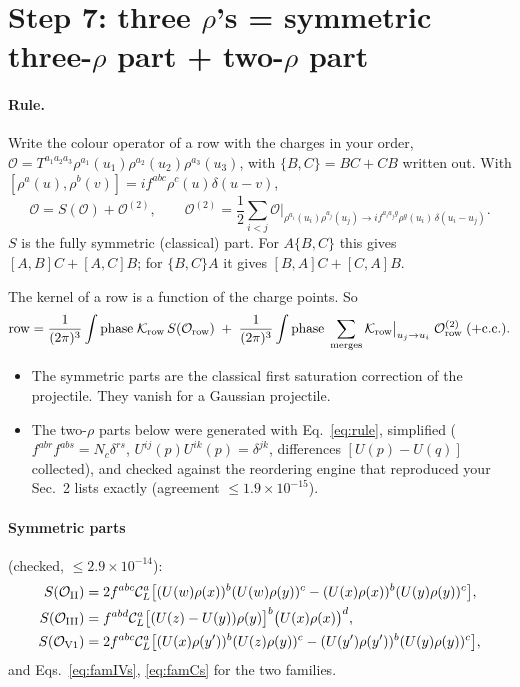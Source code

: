 \documentclass[10pt]{article}
\numberwithin{equation}{section}
\newcommand{\CL}{\mathcal C_L}
\newcommand{\OO}{\mathcal O}
\newcommand{\KK}{\mathcal K}
\newcommand{\pre}{\frac{1}{(2\pi)^3}}
\begin{document}
\section{Step 7: three \texorpdfstring{$\rho$}{rho}'s = symmetric three-\texorpdfstring{$\rho$}{rho} part + two-\texorpdfstring{$\rho$}{rho} part}\label{sec:three}
\paragraph{Rule.} Write the colour operator of a row with the charges in your order, $\OO=T^{a_1a_2a_3}\rho^{a_1}(u_1)\rho^{a_2}(u_2)\rho^{a_3}(u_3)$, with $\{B,C\}=BC+CB$ written out. With $[\rho^a(u),\rho^b(v)]=if^{abc}\rho^c(u)\delta(u-v)$,
\begin{equation}
\OO=S(\OO)+\OO^{(2)},\qquad\OO^{(2)}=\frac12\sum_{i<j}\OO\Big|_{\rho^{a_i}(u_i)\rho^{a_j}(u_j)\to if^{a_ia_jg}\rho^g(u_i)\,\delta(u_i-u_j)}.
\label{eq:rule}
\end{equation}
$S$ is the fully symmetric (classical) part. For $A\{B,C\}$ this gives $[A,B]C+[A,C]B$; for $\{B,C\}A$ it gives $[B,A]C+[C,A]B$.

The kernel of a row is a function of the charge points. So
\begin{equation*}
\text{row}=\pre\int\text{phase}\;\KK_{\rm row}\,S(\OO_{\rm row})\;+\;\pre\int\text{phase}\;\sum_{\rm merges}\KK_{\rm row}\big|_{u_j\to u_i}\;\OO^{(2)}_{\rm row}\;(+{\rm c.c.}).
\end{equation*}
\begin{itemize}
\item The symmetric parts are the classical first saturation correction of the projectile. They vanish for a Gaussian projectile.
\item The two-$\rho$ parts below were generated with Eq.~\eqref{eq:rule}, simplified ($f^{abr}f^{abs}=N_c\delta^{rs}$, $U^{ij}(p)U^{ik}(p)=\delta^{jk}$, differences $[U(p)-U(q)]$ collected), and checked against the reordering engine that reproduced your Sec.~2 lists exactly (agreement $\le$$1.9\times10^{-15}$).
\end{itemize}
\paragraph{Symmetric parts} (checked, $\le$$2.9\times10^{-14}$):
\begin{align*}
S(\OO_{\rm II})&=2f^{abc}\CL^a\big[(U(w)\rho(x))^b(U(w)\rho(y))^c-(U(x)\rho(x))^b(U(y)\rho(y))^c\big],\\
S(\OO_{\rm III})&=f^{abd}\CL^a\big[(U(z)-U(y))\rho(y)\big]^b\big(U(x)\rho(x)\big)^d,\\
S(\OO_{\rm V1})&=2f^{abc}\CL^a\big[(U(x)\rho(y'))^b(U(z)\rho(y))^c-(U(y')\rho(y'))^b(U(y)\rho(y))^c\big],
\end{align*}
and Eqs.~\eqref{eq:famIVs}, \eqref{eq:famCs} for the two families.
\end{document}
